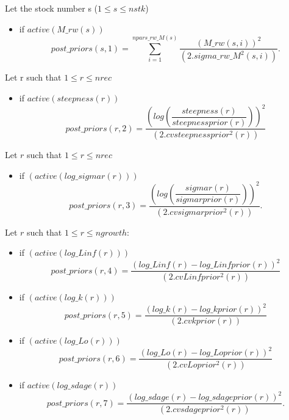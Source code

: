 \documentclass{article}
\begin{document}
    Let the stock number s ($1\leq s \leq nstk$)
    \begin{itemize}
        \item if $active(M\_rw(s))$
        \begin{equation}
             post\_priors(s,1) =  \sum_{i=1}^{npars\_rw\_M(s)}\dfrac{(M\_rw(s,i))^2}{(2.sigma\_rw\_M^2(s,i))}.
        \end{equation}
    \end{itemize}
    Let r such that $1\leq r \leq nrec$
    \begin{itemize}
        \item if $active(steepness(r))$
        \begin{equation}
            post\_priors(r,2) = \dfrac{\left(log\left(\dfrac{steepness(r)}{steepnessprior(r)}\right)\right)^2}{(2.cvsteepnessprior^2(r))}
        \end{equation}
    \end{itemize}
    Let $r$ such that $1\leq r \leq nrec$
    \begin{itemize}
        \item if $(active(log\_sigmar(r)))$
        \begin{equation}
            post\_priors(r,3) = \dfrac{\left(log\left(\dfrac{sigmar(r)}{sigmarprior(r)}\right)\right)^2}{(2.cvsigmarprior^2(r))}.
        \end{equation}
    \end{itemize}

    Let $r$ such that $1\leq r \leq ngrowth$:
    \begin{itemize}
        \item if $(active(log\_Linf(r)))$
        \begin{equation}
            post\_priors(r,4) = \dfrac{(log\_Linf(r)-log\_Linfprior(r))^2}{(2.cvLinfprior^2(r))}
        \end{equation}
        \item if $(active(log\_k(r)))$
        \begin{equation}
            post\_priors(r,5) = \dfrac{(log\_k(r)-log\_kprior(r))^2}{(2.cvkprior(r))}
        \end{equation}
        \item if $(active(log\_Lo(r)))$
        \begin{equation}
            post\_priors(r,6) = \dfrac{(log\_Lo(r)-log\_Loprior(r))^2}{(2.cvLoprior^2(r))}
        \end{equation}
        \item if $active(log\_sdage(r))$
        \begin{equation}
            post\_priors(r,7) = \dfrac{(log\_sdage(r)-log\_sdageprior(r))^2}{(2.cvsdageprior^2(r))}.
        \end{equation}
    \end{itemize}
\end{document}
